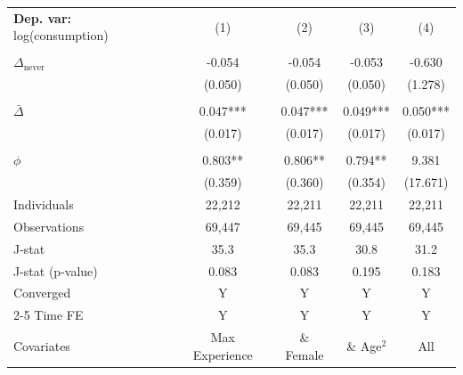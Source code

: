 \begin{tabular}{l cccc} \toprule  \textbf{Dep. var:}  log(consumption) 
                    &\multicolumn{1}{c}{(1)}   &\multicolumn{1}{c}{(2)}   &\multicolumn{1}{c}{(3)}   &\multicolumn{1}{c}{(4)}   \\
                    &               &               &               &               \\
\addlinespace
$\Delta_{\text{never}}$&      -0.054   &      -0.054   &      -0.053   &      -0.630   \\
                    &     (0.050)   &     (0.050)   &     (0.050)   &     (1.278)   \\
                    &               &               &               &               \\
\addlinespace
$\bar{\Delta}$      &       0.047***&       0.047***&       0.049***&       0.050***\\
                    &     (0.017)   &     (0.017)   &     (0.017)   &     (0.017)   \\
                    &               &               &               &               \\
\addlinespace
$\phi$              &       0.803** &       0.806** &       0.794** &       9.381   \\
                    &     (0.359)   &     (0.360)   &     (0.354)   &    (17.671)   \\
\addlinespace
Individuals         &      22,212   &      22,211   &      22,211   &      22,211   \\
Observations        &      69,447   &      69,445   &      69,445   &      69,445   \\
J-stat              &        35.3   &        35.3   &        30.8   &        31.2   \\
J-stat (p-value)    &       0.083   &       0.083   &       0.195   &       0.183   \\
Converged           &           Y   &           Y   &           Y   &           Y   \\
\cmidrule{2-5} Time FE & Y & Y & Y & Y \\ Covariates & Max Experience & \& Female & \& Age$^2$ & All \\ \bottomrule \end{tabular}
